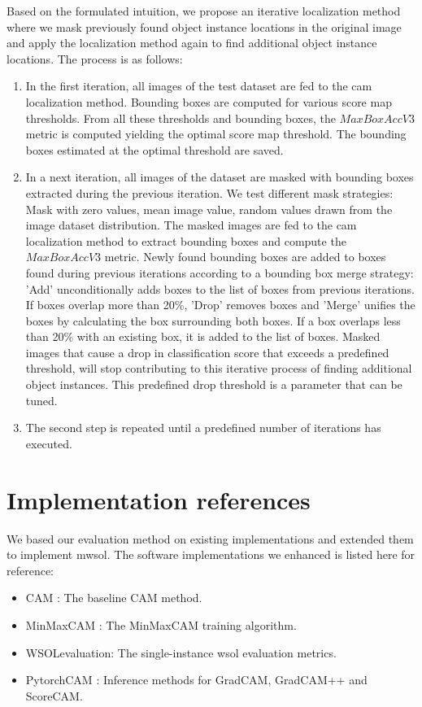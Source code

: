 Based on the formulated intuition, we propose an iterative localization method where we mask previously found object instance locations in the original image and apply the localization method again to find additional object instance locations. The process is as follows:

\begin{enumerate}
    \item In the first iteration, all images of the test dataset are fed to the \acrshort{cam} localization method. Bounding boxes are computed for various score map thresholds. From all these thresholds and bounding boxes, the $MaxBoxAccV3$ metric is computed yielding the optimal score map threshold. The bounding boxes estimated at the optimal threshold are saved.
    \item In a next iteration, all images of the dataset are masked with bounding boxes extracted during the previous iteration. We test different mask strategies: Mask with zero values, mean image value, random values drawn from the image dataset distribution. The masked images are fed to the \acrshort{cam} localization method to extract bounding boxes and compute the $MaxBoxAccV3$ metric. Newly found bounding boxes are added to boxes found during previous iterations according to a bounding box merge strategy: 'Add' unconditionally adds boxes to the list of boxes from previous iterations. If boxes overlap more than 20\%, 'Drop' removes boxes and 'Merge' unifies the boxes by calculating the box surrounding both boxes. If a box overlaps less than 20\% with an existing box, it is added to the list of boxes. Masked images that cause a drop in classification score that exceeds a predefined threshold, will stop contributing to this iterative process of finding additional object instances. This predefined drop threshold is a parameter that can be tuned.
    \item The second step is repeated until a predefined number of iterations  has executed.
\end{enumerate}

\section{Implementation references}
We based our evaluation method on existing implementations and extended them to implement \acrlong{mwsol}. The software implementations we enhanced is listed here for reference:
\begin{itemize}
    \item CAM \cite{code:CAM}: The baseline CAM method.
    \item MinMaxCAM \cite{code:MinMaxCAM}: The MinMaxCAM training algorithm.
    \item WSOLevaluation\cite{code:WSOLevaluation}: The single-instance \acrshort{wsol} evaluation metrics.
    \item PytorchCAM \cite{code:PytorchCAM}: Inference methods for GradCAM, GradCAM++ and ScoreCAM.
\end{itemize}